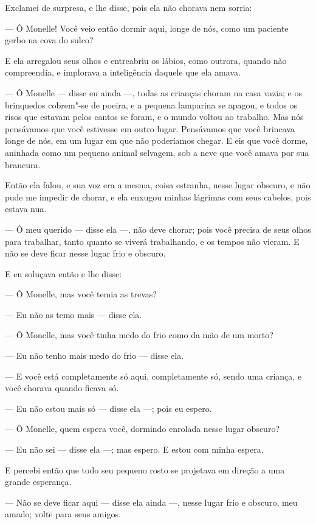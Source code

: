 Exclamei de surpresa, e lhe disse, pois ela não chorava nem sorria:

--- Ô Monelle! Você veio então dormir aqui, longe de nós, como um
paciente gerbo na cova do sulco?

E ela arregalou seus olhos e entreabriu os lábios, como outrora, quando
não compreendia, e implorava a inteligência daquele que ela amava.

--- Ô Monelle --- disse eu ainda ---, todas as crianças choram na casa vazia; e
os brinquedos cobrem"-se de poeira, e a pequena lamparina se apagou, e todos
os risos que estavam pelos cantos se foram, e o mundo voltou ao trabalho.
Mas nós pensávamos que você estivesse em outro lugar. Pensávamos que você
brincava longe de nós, em um lugar em que não poderíamos chegar. E eis que
você dorme, aninhada como um pequeno animal selvagem, sob a neve que você
amava por sua brancura.

Então ela falou, e sua voz era a mesma, coisa estranha, nesse lugar
obscuro, e não pude me impedir de chorar, e ela enxugou minhas lágrimas
com seus cabelos, pois estava nua.

--- Ô meu querido --- disse ela ---, não deve chorar; pois você precisa de seus
olhos para trabalhar, tanto quanto se viverá trabalhando, e os tempos não
vieram. E não se deve ficar nesse lugar frio e obscuro.

E eu soluçava então e lhe disse:

--- Ô Monelle, mas você temia as trevas?

--- Eu não as temo mais --- disse ela.

--- Ô Monelle, mas você tinha medo do frio como da mão de um morto?

--- Eu não tenho mais medo do frio --- disse ela.

--- E você está completamente só aqui, completamente só, sendo uma
criança, e você chorava quando ficava só.

--- Eu não estou mais só --- disse ela ---; pois eu espero.

--- Ô Monelle, quem espera você, dormindo enrolada nesse lugar obscuro?

--- Eu não sei --- disse ela ---; mas espero. E estou com minha espera.

E percebi então que todo seu pequeno rosto se projetava em direção
a uma grande esperança.

--- Não se deve ficar aqui --- disse ela ainda ---, nesse lugar frio e obscuro,
meu amado; volte para seus amigos.

